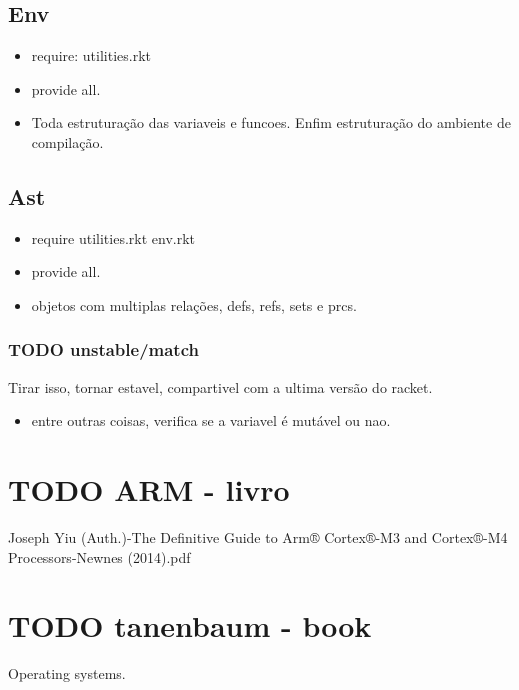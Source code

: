 \documentclass[11pt]{article}
\begin{document}
\subsection{Env}
\label{sec-7-3}

\begin{itemize}
\item require: utilities.rkt
\item provide all.
\item Toda estruturação das variaveis e funcoes. Enfim estruturação do ambiente de compilação.
\end{itemize}

\subsection{Ast}
\label{sec-7-4}
\begin{itemize}
\item require utilities.rkt env.rkt
\item provide all.
\item objetos com multiplas relações, defs, refs, sets e prcs.
\end{itemize}

\subsubsection{{\bfseries\sffamily TODO} unstable/match}
\label{sec-7-4-1}

Tirar isso, tornar estavel, compartivel com a ultima versão do racket.

\begin{itemize}
\item entre outras coisas, verifica se a variavel é mutável ou nao.
\end{itemize}


\section{{\bfseries\sffamily TODO} ARM - livro}
\label{sec-8}

Joseph Yiu (Auth.)-The Definitive Guide to Arm® Cortex®-M3 and Cortex®-M4 Processors-Newnes (2014).pdf

\section{{\bfseries\sffamily TODO} tanenbaum - book}
\label{sec-9}

Operating systems.
\end{document}
